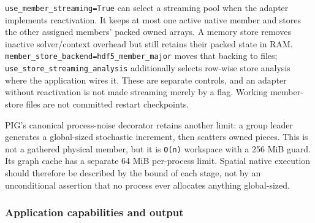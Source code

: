 \documentclass[11pt,a4paper]{article}
\newcommand{\code}[1]{\nolinkurl{#1}}
\begin{document}
\code{use_member_streaming=True} can select a streaming pool when the adapter implements reactivation. It keeps at most one active native member and stores the other assigned members' packed owned arrays. A memory store removes inactive solver/context overhead but still retains their packed state in RAM. \code{member_store_backend=hdf5_member_major} moves that backing to files; \code{use_store_streaming_analysis} additionally selects row-wise store analysis where the application wires it. These are separate controls, and an adapter without reactivation is not made streaming merely by a flag. Working member-store files are not committed restart checkpoints.

PIG's canonical process-noise decorator retains another limit: a group leader generates a global-sized stochastic increment, then scatters owned pieces. This is not a gathered physical member, but it is \code{O(n)} workspace with a 256 MiB guard. Its graph cache has a separate 64 MiB per-process limit. Spatial native execution should therefore be described by the bound of each stage, not by an unconditional assertion that no process ever allocates anything global-sized.

\clearpage
\subsubsection{Application capabilities and output}
\end{document}
